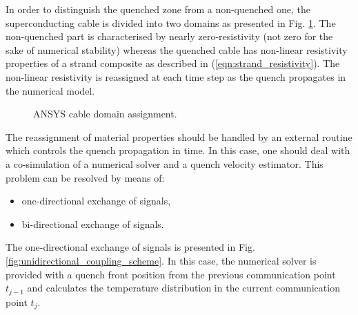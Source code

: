 
In order to distinguish the quenched zone from a non-quenched one, the superconducting cable is divided into two domains as presented in Fig. \ref{fig:ansys_material_assignment}. The non-quenched part is characterised by nearly zero-resistivity (not zero for the sake of numerical stability) whereas the quenched cable has non-linear resistivity properties of a strand composite as described in (\ref{eqn:strand_resistivity}). The non-linear resistivity is reassigned at each time step as the quench propagates in the numerical model.

\begin{figure}[H]
\centering
{}
\caption{ANSYS cable domain assignment.}
    \label{fig:ansys_material_assignment}
\end{figure}

The reassignment of material properties should be handled by an external routine which controls the quench propagation in time. In this case, one should deal with a co-simulation of a numerical solver and a quench velocity estimator. This problem can be resolved by means of: 

\begin{itemize}
    \item one-directional exchange of signals,
    \item bi-directional exchange of signals.
\end{itemize}

The one-directional exchange of signals is presented in Fig. \ref{fig:unidirectional_coupling_scheme}. In this case, the numerical solver is provided with a quench front position from the previous communication point $t_{j-1}$ and calculates the temperature distribution in the current communication point $t_j$.

